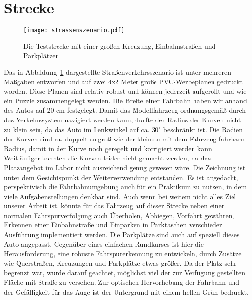 \section{Strecke}

\begin{figure}[H] %
  \centering
  \texttt{[image: strassenszenario.pdf]}
  \caption{Die Teststrecke mit einer großen Kreuzung, Einbahnstraßen und Parkplätzen}
  \label{fig:strassenszenario}
\end{figure}

Das in Abbildung~\ref{fig:strassenszenario} dargestellte Straßenverkehrsszenario ist unter mehreren Maßgaben entworfen und auf zwei 4x2 Meter große PVC-Werbeplanen gedruckt worden. Diese Planen sind relativ robust und können jederzeit aufgerollt und wie ein Puzzle zusammengelegt werden. Die Breite einer Fahrbahn haben wir anhand des Autos auf 20 cm festgelegt. Damit das Modellfahrzeug ordnungsgemäß durch das Verkehrssystem navigiert werden kann, durfte der Radius der Kurven nicht zu klein sein, da das Auto im Lenkwinkel auf ca. 30\(^\circ\) beschränkt ist. Die Radien der Kurven sind ca. doppelt so groß wie der kleinste mit dem Fahrzeug fahrbare Radius, damit in der Kurve noch geregelt und korrigiert werden kann. Weitläufiger konnten die Kurven leider nicht gemacht werden, da das Platzangebot im Labor nicht ausreichend genug gewesen wäre.
Die Zeichnung ist unter dem Gesichtspunkt der Weiterverwendung entstanden. Es ist angedacht, perspektivisch die Fahrbahnumgebung auch für ein Praktikum zu nutzen, in dem viele Aufgabenstellungen denkbar sind. Auch wenn bei weitem nicht alles Ziel unserer Arbeit ist, könnte für das Fahrzeug auf dieser Strecke neben einer normalen Fahrspurverfolgung auch Überholen, Abbiegen, Vorfahrt gewähren, Erkennen einer Einbahnstraße und Einparken in Parktaschen verschieder Ausführung implementiert werden. Die Parkplätze sind auch auf speziell dieses Auto angepasst. Gegenüber eines einfachen Rundkurses ist hier die Herausforderung, eine robuste Fahrspurerkennung zu entwickeln, durch Zusätze wie Querstraßen, Kreuzungen und Parkplätze etwas größer. Da der Platz sehr begrenzt war, wurde darauf geachtet, möglichst viel der zur Verfügung gestellten Fläche mit Straße zu versehen. Zur optischen Hervorhebung der Fahrbahn und der Gefälligkeit für das Auge ist der Untergrund mit einem hellen Grün bedruckt.
